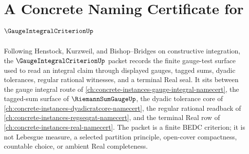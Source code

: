 \chapter{A Concrete Naming Certificate for $\GaugeIntegralCriterionUp$}
\label{ch:concrete-instances-gauge-integral-criterion-namecert}

Following Henstock, Kurzweil, and Bishop--Bridges on constructive integration, the $\GaugeIntegralCriterionUp$ packet records the finite gauge-test surface used to read an integral claim through displayed gauges, tagged sums, dyadic tolerances, regular rational witnesses, and a terminal Real seal. It sits between the gauge integral route of \autoref{ch:concrete-instances-gauge-integral-namecert}, the tagged-sum surface of $\RiemannSumGaugeUp$, the dyadic tolerance core of \autoref{ch:concrete-instances-dyadicratcore-namecert}, the regular rational readback of \autoref{ch:concrete-instances-regseqrat-namecert}, and the terminal Real row of \autoref{ch:concrete-instances-real-namecert}. The packet is a finite BEDC criterion; it is not Lebesgue measure, a selected partition principle, open-cover compactness, countable choice, or ambient Real completeness.

